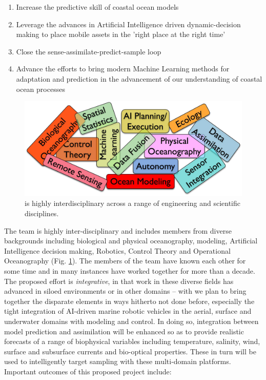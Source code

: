 \begin{enumerate}

\item Increase the predictive skill of coastal ocean models

\item Leverage the advances in Artificial Intelligence driven
  dynamic-decision making to place mobile assets in the 'right place
  at the right time'

\item Close the sense-assimilate-predict-sample loop
  
\item Advance the efforts to bring modern Machine Learning methods for
  adaptation and prediction in the advancement of our understanding of
  coastal ocean processes
  
\end{enumerate}

\begin{figure}
  \centering
  \includegraphics[scale=0.08]{fig/concepts.jpg}
  \caption{\proj is highly interdisciplinary across a range of
    engineering and scientific disciplines.}
  \label{fig:concepts}
\end{figure}

\noindent
The \proj team is highly inter-disciplinary and includes members from
diverse backgrounds including biological and physical oceanography,
modeling, Artificial Intelligence decision making, Robotics, Control
Theory and Operational Oceanography (Fig. \ref{fig:concepts}). The
members of the team have known each other for some time and in many
instances have worked together for more than a decade.  The proposed
effort is \emph{integrative}, in that work in these diverse fields has
advanced in siloed environments or in other domains -- with \proj we
plan to bring together the disparate elements in ways hitherto not
done before, especially the tight integration of AI-driven marine
robotic vehicles in the aerial, surface and underwater domains with
modeling and control. In doing so, integration between model
prediction and assimilation will be enhanced so as to provide
realistic forecasts of a range of biophysical variables including
temperature, salinity, wind, surface and subsurface currents and
bio-optical properties. These in turn will be used to intelligently
target sampling with these multi-domain platforms. Important outcomes
of this proposed project include:

